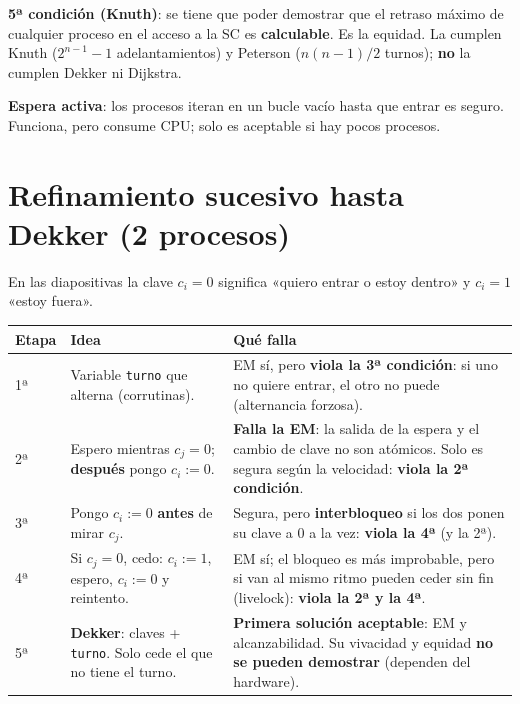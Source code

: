 \documentclass[11pt,a4paper,oneside]{report}
\begin{document}
\textbf{5ª condición (Knuth)}: se tiene que poder demostrar que el retraso máximo de cualquier proceso en el acceso
a la SC es \textbf{calculable}. Es la equidad. La cumplen Knuth ($2^{n-1}-1$ adelantamientos) y Peterson
($n(n-1)/2$ turnos); \textbf{no} la cumplen Dekker ni Dijkstra.

\textbf{Espera activa}: los procesos iteran en un bucle vacío hasta que entrar es seguro. Funciona, pero
consume CPU; solo es aceptable si hay pocos procesos.

\section{Refinamiento sucesivo hasta Dekker (2 procesos)}
En las diapositivas la clave $c_i = 0$ significa «quiero entrar o estoy dentro» y $c_i = 1$ «estoy fuera».

\begin{center}\small
\begin{tabular}{p{1.3cm}p{5.6cm}p{6.6cm}}
\toprule
\textbf{Etapa} & \textbf{Idea} & \textbf{Qué falla} \\ \midrule
1ª & Variable \texttt{turno} que alterna (corrutinas). & EM sí, pero \textbf{viola la 3ª condición}: si uno no quiere entrar, el otro no puede (alternancia forzosa). \\
2ª & Espero mientras $c_j=0$; \textbf{después} pongo $c_i:=0$. & \textbf{Falla la EM}: la salida de la espera y el cambio de clave no son atómicos. Solo es segura según la velocidad: \textbf{viola la 2ª condición}. \\
3ª & Pongo $c_i:=0$ \textbf{antes} de mirar $c_j$. & Segura, pero \textbf{interbloqueo} si los dos ponen su clave a 0 a la vez: \textbf{viola la 4ª} (y la 2ª). \\
4ª & Si $c_j=0$, cedo: $c_i:=1$, espero, $c_i:=0$ y reintento. & EM sí; el bloqueo es más improbable, pero si van al mismo ritmo pueden ceder sin fin (livelock): \textbf{viola la 2ª y la 4ª}. \\
5ª & \textbf{Dekker}: claves + \texttt{turno}. Solo cede el que no tiene el turno. & \textbf{Primera solución aceptable}: EM y alcanzabilidad. Su vivacidad y equidad \textbf{no se pueden demostrar} (dependen del hardware). \\
\bottomrule
\end{tabular}
\end{center}
\end{document}
